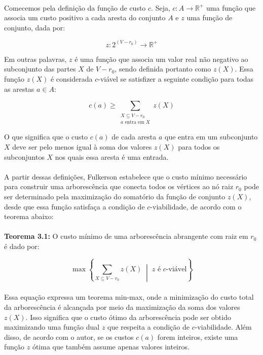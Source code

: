 \documentclass[12pt,a4paper]{article}
\begin{document}
\paragraph{}
Comecemos pela definição da função de custo \( c \). Seja, \( c: A \to \mathbb{R}^+ \) uma função que associa um custo positivo a cada aresta do conjunto \( A \) e \( z \) uma função de conjunto, dada por:

\[
z : 2^{(V - r_0)} \to \mathbb{R}^+
\]

Em outras palavras, \( z \) é uma função que associa um valor real não negativo ao subconjunto das partes \( X \) de \( V - r_0 \), sendo definida portanto como \( z(X) \). Essa função \( z(X) \) é considerada \( c \)-viável se satisfizer a seguinte condição para todas as arestas \( a \in A \):

\[
c(a) \geq \sum_{\substack{X \subseteq V - r_0 \\ a \text{ entra em } X}} z(X)
\]

O que significa que o custo \( c(a) \) de cada aresta \( a \) que entra em um subconjunto \( X \) deve ser pelo menos igual à soma dos valores \( z(X) \) para todos os subconjuntos \( X \) nos quais essa aresta é uma entrada.

\paragraph{}
A partir dessas definições, Fulkerson estabelece que o custo mínimo necessário para construir uma arborescência que conecta todos os vértices ao nó raiz \( r_0 \) pode ser determinado pela maximização do somatório da função de conjunto \( z(X) \), desde que essa função satisfaça a condição de \( c \)-viabilidade, de acordo com o teorema abaixo:

\paragraph{}
\textbf{Teorema 3.1:} O custo mínimo de uma arborescência abrangente com raiz em \( r_0 \) é dado por:

\[
\max \left\{ \sum_{X \subseteq V - r_0} z(X) \;\middle|\; z \text{ é } c\text{-viável} \right\}
\]

\paragraph{}
Essa equação expressa um teorema min-max, onde a minimização do custo total da arborescência é alcançada por meio da maximização da soma dos valores \( z(X) \). Isso significa que o custo ótimo da arborescência pode ser obtido maximizando uma função dual \( z \) que respeita a condição de \( c \)-viabilidade. Além disso, de acordo com o autor, se os custos \( c(a) \) forem inteiros, existe uma função \( z \) ótima que também assume apenas valores inteiros.
\end{document}
